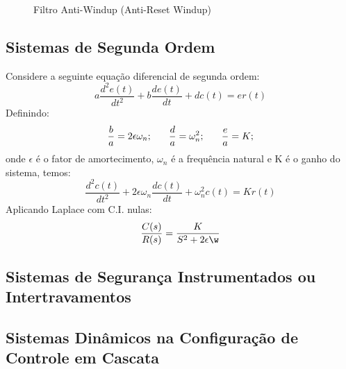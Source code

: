 \begin{enumerate}
\begin{enumerate}
\begin{figure}[h]
                            \caption{Filtro Anti-Windup (Anti-Reset Windup)}
                            \label{fig:filtro_anti_windup}
                        \end{figure}
        \end{enumerate}
\end{enumerate}
\newpage

\subsection{Sistemas de Segunda Ordem}
\hspace{4ex}Considere a seguinte equação diferencial de segunda ordem:
    \[a\frac{d^2e(t)}{dt^2}+b\frac{de(t)}{dt}+dc(t)=er(t)\]
Definindo:
    \[\frac{b}{a}=2\epsilon\omega_n; \hspace{4ex} \frac{d}{a}=\omega^2_n; \hspace{4ex} \frac{e}{a}=K;\]
onde \(\epsilon\) é o fator de amortecimento, \(\omega_n\) é a frequência natural e K é o ganho do sistema, temos:
    \[\frac{d^2c(t)}{dt^2}+2\epsilon\omega_n\frac{dc(t)}{dt}+\omega_n^2c(t) = Kr(t)\]
Aplicando Laplace com C.I. nulas: 
    \[\frac{C(s)}{R(s)} = \frac{K}{S^2+2\epsilon\w}\]

\subsection{Sistemas de Segurança Instrumentados ou Intertravamentos}\hspace{4ex}

\subsection{Sistemas Dinâmicos na Configuração de Controle em Cascata}\hspace{4ex}